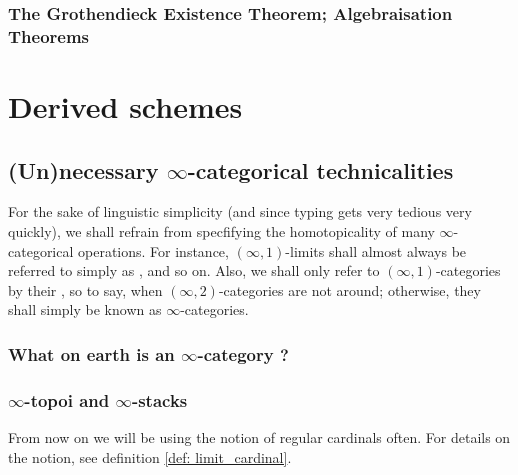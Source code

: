             \subsubsection{The Grothendieck Existence Theorem; Algebraisation Theorems}

    \section{Derived schemes}
        \subsection{(Un)necessary \texorpdfstring{$\infty$}{}-categorical technicalities}
            \begin{convention}
                For the sake of linguistic simplicity (and since typing \say{$\infty$} gets very tedious very quickly), we shall refrain from specfifying the homotopicality of many $\infty$-categorical operations. For instance, $(\infty, 1)$-limits shall almost always be referred to simply as , and so on. Also, we shall only refer to $(\infty, 1)$-categories by their , so to say, when $(\infty, 2)$-categories are not around; otherwise, they shall simply be known as $\infty$-categories.
            \end{convention}
            
            \subsubsection{What on earth is an \texorpdfstring{$\infty$}{}-category ?}
        
            \subsubsection{\texorpdfstring{$\infty$}{}-topoi and \texorpdfstring{$\infty$}{}-stacks}
                \begin{remark}
                    From now on we will be using the notion of regular cardinals often. For details on the notion, see definition \ref{def: limit_cardinal}.
                \end{remark}
            
